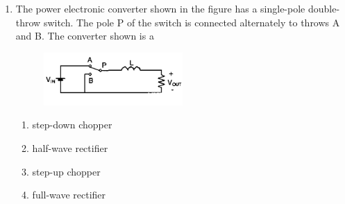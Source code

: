 \documentclass[12pt]{article}
\theoremstyle{remark}
\begin{document}
\begin{enumerate}
\item The power electronic converter shown in the figure has a single-pole double-throw switch. The pole P of the switch is connected alternately to throws A and B. The converter shown is a
\begin{figure}[H]
    \centering
    \includegraphics[width=0.5\textwidth]{Figs/Q23.png}
    \caption{}
    \label{fig:1.14}
\end{figure}
\begin{enumerate}
    \item step-down chopper 
    \item half-wave rectifier
    \item step-up chopper 
    \item full-wave rectifier
\end{enumerate}
\hfill{}


\end{enumerate}
\end{document}
